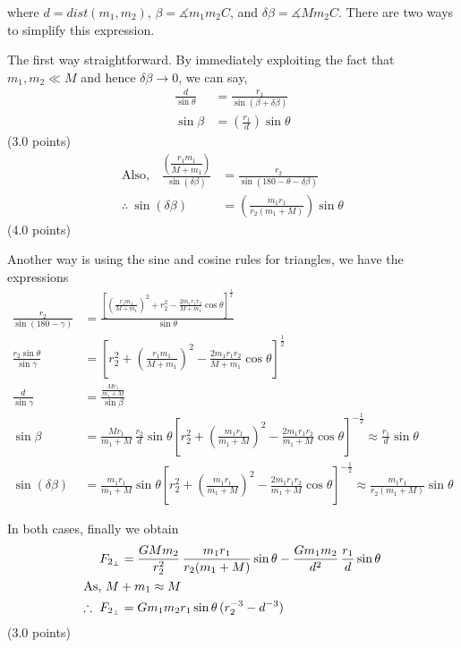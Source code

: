\begin{description}
  where $d = \mathit{dist}(m_1, m_2)$, $\beta = \measuredangle m_1 m_2 C$, and
  $\delta\beta = \measuredangle M m_2 C$. There are two ways to simplify this
  expression.

  The first way straightforward. By immediately exploiting the fact that %
  $m_1, m_2 \ll M$ and hence $\delta\beta \to 0$, we can say,
  \begin{align*}
    \frac{d}{\sin\theta} &= \frac{r_1}{\sin(\beta + \delta\beta)} \\
    \sin\beta &= \left(\frac{r_1}{d}\right)\sin\theta
  \end{align*}
  \hfill(3.0 points)
  \begin{align*}
    \text{Also,}\quad
    \frac{\left(\dfrac{r_1 m_1}{M + m_1}\right)}{\sin(\delta\beta)}
      &= \frac{r_2}{\sin(180 - \theta - \delta\beta)} \\
    \therefore\ \sin(\delta\beta)
      &= \left(\frac{m_1 r_1}{r_2(m_1 + M)}\right)\sin\theta
  \end{align*}
  \hfill(4.0 points)

  Another way is using the sine and cosine rules for triangles, we have the
  expressions
  \begin{align*}
    \frac{r_2}{\sin(180 - \gamma)}
      &= \frac{\left[\left(\frac{r_1 m_1}{M + m_1}\right)^2 + r_2^2
         - \frac{2m_1 r_1 r_2}{M + m_1}\cos\theta\right]^{\frac{1}{2}}}
         {\sin\theta} \\
    \frac{r_2\sin\theta}{\sin\gamma}
      &= \left[r_2^2 + \left(\frac{r_1 m_1}{M + m_1}\right)^2
         - \frac{2m_1 r_1 r_2}{M + m_1}\cos\theta\right]^{\frac{1}{2}} \\
    \frac{d}{\sin\gamma} &= \frac{\frac{Mr_1}{m_1 + M}}{\sin\beta} \\
    \sin\beta &= \frac{Mr_1}{m_1 + M}\,\frac{r_2}{d}\sin\theta
       \left[r_2^2 + \left(\frac{m_1 r_1}{m_1 + M}\right)^2
       - \frac{2m_1 r_1 r_2}{m_1 + M}\cos\theta\right]^{-\frac{1}{2}}
       \approx \frac{r_1}{d}\sin\theta \\
    \sin(\delta\beta) &= \frac{m_1 r_1}{m_1 + M}\sin\theta
       \left[r_2^2 + \left(\frac{m_1 r_1}{m_1 + M}\right)^2
       - \frac{2m_1 r_1 r_2}{m_1 + M}\cos\theta\right]^{-\frac{1}{2}}
       \approx \frac{m_1 r_1}{r_2(m_1 + M)}\sin\theta
  \end{align*}

  In both cases, finally we obtain
  \begin{align*}
    F_{2_\perp} &= \frac{GMm_2}{r_2^2}\,\frac{m_1 r_1}{r_2(m_1 + M)}\sin\theta
      - \frac{Gm_1 m_2}{d^2}\,\frac{r_1}{d}\sin\theta \\
    \intertext{As, $M + m_1 \approx M$}
    \therefore\ F_{2_\perp} &= Gm_1 m_2 r_1\sin\theta\,(r_2^{-3} - d^{-3})
  \end{align*}
  \hfill(3.0 points)


\end{description}
